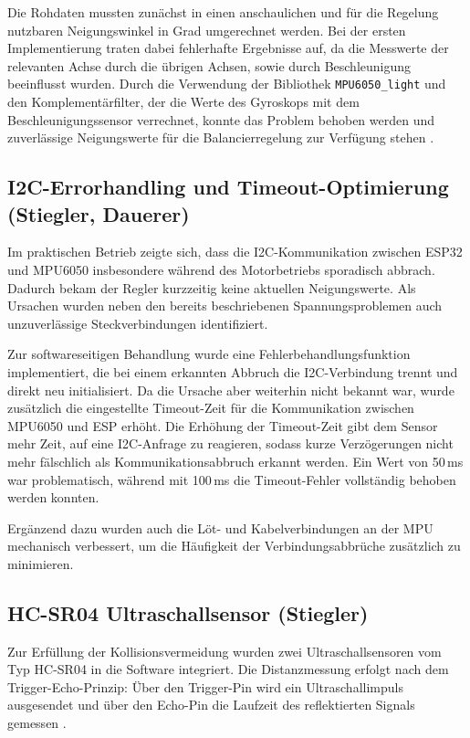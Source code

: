 \documentclass[fontsize=12pt,
parskip=half,	%
department=FakM,  %
logostyle=flat,
twoside, %
DIV=15,BCOR=10mm, %
]{OTHRreprt}
\begin{document}
Die Rohdaten mussten zunächst in einen anschaulichen und für die Regelung nutzbaren Neigungswinkel in Grad umgerechnet werden. Bei der ersten Implementierung traten dabei fehlerhafte Ergebnisse auf, da die Messwerte der relevanten Achse durch die übrigen Achsen, sowie durch Beschleunigung beeinflusst wurden. Durch die Verwendung der Bibliothek \texttt{MPU6050\_light} und den Komplementärfilter, der die Werte des Gyroskops mit dem Beschleunigungssensor verrechnet, konnte das Problem behoben werden und zuverlässige Neigungswerte für die Balancierregelung zur Verfügung stehen \cite{rfetickMPU6050_light_library}.

\subsection{I2C-Errorhandling und Timeout-Optimierung (Stiegler, Dauerer)}
\label{subsec:i2c_errorhandling}

Im praktischen Betrieb zeigte sich, dass die I2C-Kommunikation zwischen ESP32 und MPU6050 insbesondere während des Motorbetriebs sporadisch abbrach. Dadurch bekam der Regler kurzzeitig keine aktuellen Neigungswerte. Als Ursachen wurden neben den bereits beschriebenen Spannungsproblemen auch unzuverlässige Steckverbindungen identifiziert.

Zur softwareseitigen Behandlung wurde eine Fehlerbehandlungsfunktion implementiert, die bei einem erkannten Abbruch die I2C-Verbindung trennt und direkt neu initialisiert. Da die Ursache aber weiterhin nicht bekannt war, wurde zusätzlich die eingestellte Timeout-Zeit für die Kommunikation zwischen MPU6050 und ESP erhöht. Die Erhöhung der Timeout-Zeit gibt dem Sensor mehr Zeit, auf eine I2C-Anfrage zu reagieren, sodass kurze Verzögerungen nicht mehr fälschlich als Kommunikationsabbruch erkannt werden. Ein Wert von 50\,ms war problematisch, während mit 100\,ms die Timeout-Fehler vollständig behoben werden konnten.

Ergänzend dazu wurden auch die Löt- und Kabelverbindungen an der MPU mechanisch verbessert, um die Häufigkeit der Verbindungsabbrüche zusätzlich zu minimieren.

\subsection{HC-SR04 Ultraschallsensor (Stiegler)}
\label{subsec:hcsr04}

Zur Erfüllung der Kollisionsvermeidung wurden zwei Ultraschallsensoren vom Typ HC-SR04 in die Software integriert. Die Distanzmessung erfolgt nach dem Trigger-Echo-Prinzip: Über den Trigger-Pin wird ein Ultraschallimpuls ausgesendet und über den Echo-Pin die Laufzeit des reflektierten Signals gemessen \cite{reicheltHCSR04_Datasheet}.
\end{document}

